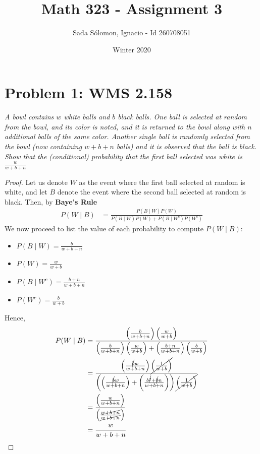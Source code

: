 \documentclass{article}
\title{Math 323
	- Assignment 3}
\author{Sada S\'{o}lomon, Ignacio - Id 260708051}
\date{Winter 2020}  %
\begin{document}
\clearpage\maketitle
\thispagestyle{empty}
\vspace{2cm}

\newpage
\setcounter{page}{1}
\cfoot{\thepage}

\pagebreak

\section*{Problem 1: WMS 2.158}
\emph{A bowl contains $w$ white balls and $b$ black balls. One ball is selected at random from the bowl, and its color is noted, and it is returned to the bowl along with $n$ additional balls of the same color. Another single ball is randomly selected from the bowl (now containing $w+b+n$ balls) and it is observed that the ball is black. Show that the (conditional) probability that the first ball selected was white is} $\frac{w}{w+b+n}$
\begin{proof}
	Let us denote $W$ as the event where the first ball selected at random is white, and let $B$ denote the event where the second ball selected at random is black. Then, by \textbf{Baye's Rule}
	\begin{align*}
		P(W \mid B) &= \frac{P (B \mid W) P (W)}{P(B \mid W) P (W) + P (B \mid W^c) P(W^c)}
	\end{align*}
	We now proceed to list the value of each probability to compute $P(W \mid B)$:
	\begin{multicols}{2}
		\begin{itemize}
			\item $P(B \mid W)  = \frac{b}{w+b+n}$
			\item $P (W) = \frac{w}{w+b}$
			\item $P (B \mid W^c) = \frac{b+n}{w+b+n}$
			\item $P (W^c) = \frac{b}{w+b}$
		\end{itemize}
	\end{multicols}
	Hence,
	\begin{align*}
	P(W \mid B) &= \frac{\left( \frac{b}{w+b+n} \right) \left(\frac{w}{w+b}\right)}{\left( \frac{b}{w+b+n} \right) \left(\frac{w}{w+b}\right) + \left( \frac{b+n}{w+b+n} \right) \left(\frac{b}{w+b}\right)}\\
	&= \frac{\left( \frac{\cancel{b}w}{w+b+n} \right) \cancel{\left(\frac{1}{w+b}\right)}}{\left(  \left(\frac{\cancel{b}w}{w+b+n}\right) + \left(\frac{b^{\cancel{2}}+\cancel{b}n}{w+b+n}\right) \right) \cancel{\left( \frac{1}{w+b} \right)}} \\
	&= \frac{\left(\frac{w}{w+b+n}\right)}{\left( \frac{\cancel{w+b+n}}{\cancel{w+b+n}} \right)} \\
	&= \frac{w}{w+b+n}
	\end{align*}
\end{proof}
\end{document}
